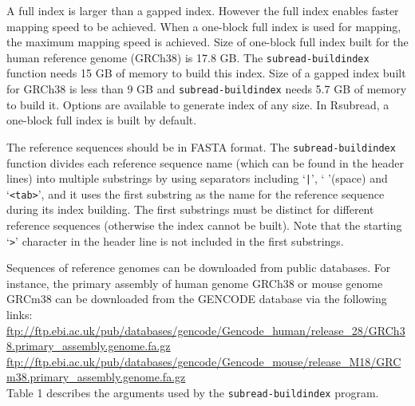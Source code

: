 \documentclass[12pt]{report}
\newcommand{\code}[1]{{\small\texttt{#1}}}
\newcommand{\Rsubread}{\textsf{Rsubread}}
\begin{document}
A full index is larger than a gapped index.
However the full index enables faster mapping speed to be achieved.
When a one-block full index is used for mapping, the maximum mapping speed is achieved.
Size of one-block full index built for the human reference genome (GRCh38) is 17.8 GB.
The \code{subread-buildindex} function needs 15 GB of memory to build this index.
Size of a gapped index built for GRCh38 is less than 9 GB and \code{subread-buildindex} needs 5.7 GB of memory to build it.
Options are available to generate index of any size.
In \Rsubread, a one-block full index is built by default.

The reference sequences should be in FASTA format.
The \code{subread-buildindex} function divides each reference sequence name (which can be found in the header lines) into multiple substrings by using separators including `\code{|}', ` '(space) and `\code{<tab>}', and it uses the first substring as the name for the reference sequence during its index building.
The first substrings must be distinct for different reference sequences (otherwise the index cannot be built).
Note that the starting `\code{>}' character in the header line is not included in the first substrings.

Sequences of reference genomes can be downloaded from public databases.
For instance, the primary assembly of human genome GRCh38 or mouse genome GRCm38 can be downloaded from the GENCODE database via the following links:\\

\noindent\href{ftp://ftp.ebi.ac.uk/pub/databases/gencode/Gencode_human/release_28/GRCh38.primary_assembly.genome.fa.gz}{\color{blue}\url{ftp://ftp.ebi.ac.uk/pub/databases/gencode/Gencode_human/release_28/GRCh38.primary_assembly.genome.fa.gz}}\\

\noindent\href{ftp://ftp.ebi.ac.uk/pub/databases/gencode/Gencode_mouse/release_M18/GRCm38.primary_assembly.genome.fa.gz}{\color{blue}\url{ftp://ftp.ebi.ac.uk/pub/databases/gencode/Gencode_mouse/release_M18/GRCm38.primary_assembly.genome.fa.gz}}\\

Table 1 describes the arguments used by the \code{subread-buildindex} program.

\newpage
\end{document}
